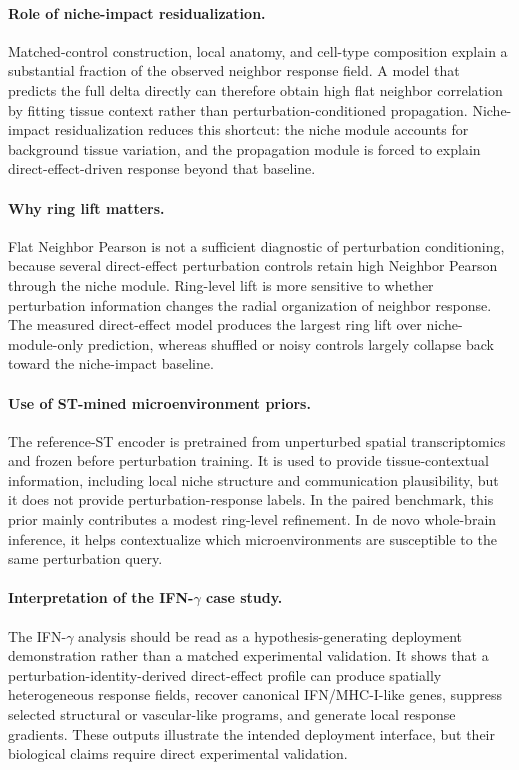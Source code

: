 \documentclass[sigconf,review,balance=false]{acmart}
\begin{document}
\paragraph{Role of niche-impact residualization.}
Matched-control construction, local anatomy, and cell-type composition explain a substantial fraction of the observed neighbor response field. A model that predicts the full delta directly can therefore obtain high flat neighbor correlation by fitting tissue context rather than perturbation-conditioned propagation. Niche-impact residualization reduces this shortcut: the niche module accounts for background tissue variation, and the propagation module is forced to explain direct-effect-driven response beyond that baseline.

\paragraph{Why ring lift matters.}
Flat Neighbor Pearson is not a sufficient diagnostic of perturbation conditioning, because several direct-effect perturbation controls retain high Neighbor Pearson through the niche module. Ring-level lift is more sensitive to whether perturbation information changes the radial organization of neighbor response. The measured direct-effect model produces the largest ring lift over niche-module-only prediction, whereas shuffled or noisy controls largely collapse back toward the niche-impact baseline.

\paragraph{Use of ST-mined microenvironment priors.}
The reference-ST encoder is pretrained from unperturbed spatial transcriptomics and frozen before perturbation training. It is used to provide tissue-contextual information, including local niche structure and communication plausibility, but it does not provide perturbation-response labels. In the paired benchmark, this prior mainly contributes a modest ring-level refinement. In de novo whole-brain inference, it helps contextualize which microenvironments are susceptible to the same perturbation query.

\paragraph{Interpretation of the IFN-$\gamma$ case study.}
The IFN-$\gamma$ analysis should be read as a hypothesis-generating deployment demonstration rather than a matched experimental validation. It shows that a perturbation-identity-derived direct-effect profile can produce spatially heterogeneous response fields, recover canonical IFN/MHC-I-like genes, suppress selected structural or vascular-like programs, and generate local response gradients. These outputs illustrate the intended deployment interface, but their biological claims require direct experimental validation.
\end{document}

